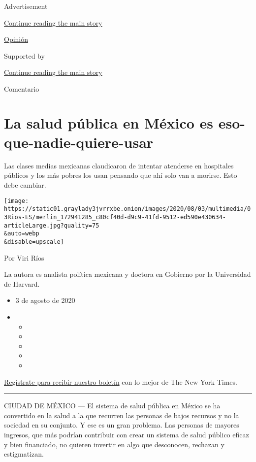 Advertisement

\protect\hyperlink{after-top}{Continue reading the main story}

\href{/es/section/opinion}{Opinión}

Supported by

\protect\hyperlink{after-sponsor}{Continue reading the main story}

Comentario

\hypertarget{la-salud-puxfablica-en-muxe9xico-es-eso-que-nadie-quiere-usar}{%
\section{La salud pública en México es
eso-que-nadie-quiere-usar}\label{la-salud-puxfablica-en-muxe9xico-es-eso-que-nadie-quiere-usar}}

Las clases medias mexicanas claudicaron de intentar atenderse en
hospitales públicos y los más pobres los usan pensando que ahí solo van
a morirse. Esto debe cambiar.

\texttt{[image: https://static01.graylady3jvrrxbe.onion/images/2020/08/03/multimedia/03Rios-ES/merlin\_172941285\_c80cf40d-d9c9-41fd-9512-ed590e430634-articleLarge.jpg?quality=75\\\&auto=webp\\\&disable=upscale]}

Por Viri Ríos

La autora es analista política mexicana y doctora en Gobierno por la
Universidad de Harvard.

\begin{itemize}
\item
  3 de agosto de 2020
\item
  \begin{itemize}
  \item
  \item
  \item
  \item
  \item
  \end{itemize}
\end{itemize}

\href{https://www.nytimes3xbfgragh.onion/newsletters/el-times}{Regístrate
para recibir nuestro boletín} con lo mejor de The New York Times.

\begin{center}\rule{0.5\linewidth}{\linethickness}\end{center}

CIUDAD DE MÉXICO --- El sistema de salud pública en México se ha
convertido en la salud a la que recurren las personas de bajos recursos
y no la sociedad en su conjunto. Y ese es un gran problema. Las personas
de mayores ingresos, que más podrían contribuir con crear un sistema de
salud público eficaz y bien financiado, no quieren invertir en algo que
desconocen, rechazan y estigmatizan.


